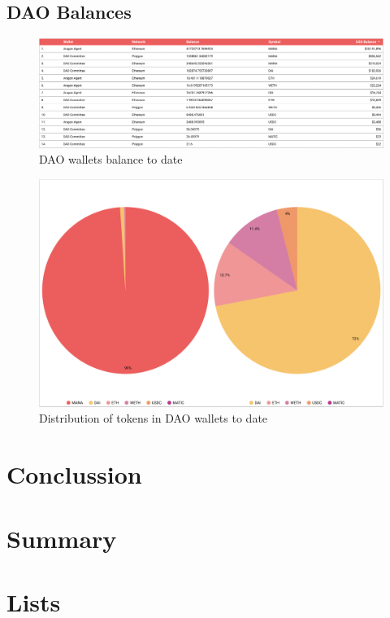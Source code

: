 \documentclass[MSE,Master,english]{twbook}%
\begin{document}
\section{DAO Balances}
\begin{figure}[H]
  \centering
  \includegraphics[width=\textwidth]{metrics/dao_balance.png}
  \caption{DAO wallets balance to date}
  \label{fig:dao_balance}
\end{figure}
\begin{figure}[H]
  \centering
  \includegraphics[width=\textwidth]{metrics/token_distribution.png}
  \caption{Distribution of tokens in DAO wallets to date}
  \label{fig:token_distribution}
\end{figure}

\chapter{Conclussion}
\toComplete

\chapter{Summary}
\toComplete

\chapter{Lists}
\toComplete
\end{document}
